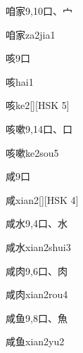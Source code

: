 \begin{entry}{咱家}{9,10}{⼝、⼧}
  \begin{phonetics}{咱家}{za2jia1}
  \end{phonetics}
\end{entry}

\begin{entry}{咳}{9}{⼝}
  \begin{phonetics}{咳}{hai1}
  \end{phonetics}
  \begin{phonetics}{咳}{ke2}[][HSK 5]
  \end{phonetics}
\end{entry}

\begin{entry}{咳嗽}{9,14}{⼝、⼝}
  \begin{phonetics}{咳嗽}{ke2sou5}
  \end{phonetics}
\end{entry}

\begin{entry}{咸}{9}{⼝}
  \begin{phonetics}{咸}{xian2}[][HSK 4]
  \end{phonetics}
\end{entry}

\begin{entry}{咸水}{9,4}{⼝、⽔}
  \begin{phonetics}{咸水}{xian2shui3}
  \end{phonetics}
\end{entry}

\begin{entry}{咸肉}{9,6}{⼝、⾁}
  \begin{phonetics}{咸肉}{xian2rou4}
  \end{phonetics}
\end{entry}

\begin{entry}{咸鱼}{9,8}{⼝、⿂}
  \begin{phonetics}{咸鱼}{xian2yu2}
  \end{phonetics}
\end{entry}

